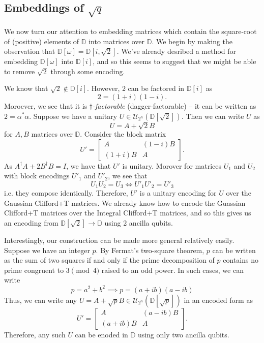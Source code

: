 \documentclass{article}
\theoremstyle{definition}
\theoremstyle{theorem}
\theoremstyle{remark}
\begin{document}
   	\subsection{Embeddings of $\sqrt{q}$}
    We now turn our attention to embedding matrices which contain the square-root of (positive) elements of $\mathbb{D}$ into matrices over $\mathbb{D}$. We begin by making the observation that $\mathbb{D}[\omega] = \mathbb{D}[i,\sqrt{2}]$. We've already desribed a method for embedding $\mathbb{D}[\omega]$ into $\mathbb{D}[i]$, and so this seems to suggest that we might be able to remove $\sqrt{2}$ through some encoding.
    
    We know that $\sqrt{2}\not\in\mathbb{D}[i]$. However, 2 can be factored in $\mathbb{D}[i]$ as
    \[
    	2 = (1+i)(1-i).
    \]
    Moroever, we see that it is \emph{$\dagger$-factorable} (dagger-factorable) -- it can be written as $2 = \alpha^* \alpha$. Suppose we have a unitary $U\in\mathcal{U}_{2^n}(\mathbb{D}[\sqrt{2}])$. Then we can write $U$ as
    \[
    	U = A + \sqrt{2}B
    \]
    for $A,B$ matrices over $\mathbb{D}$. Consider the block matrix
    \[
    	U' = \begin{bmatrix}
    	A & (1-i) B\\
    	(1+i)B & A
    	\end{bmatrix}.
    \]
    As $A^\dagger A + 2 B^\dagger B = I$, we have that $U'$ is unitary. Morover for matrices $U_1$ and $U_2$ with block encodings $U'_1$ and $U'_2$, we see that
    \[
    	U_1 U_2 = U_3 \iff U'_1 U'_2 = U'_3
     \]
     i.e. they compose identically. Therefore, $U'$ is a unitary encoding for $U$ over the Gaussian Clifford+T matrices. We already know how to encode the Guassian Clifford+T matrices over the Integral Clifford+T matrices, and so this gives us an encoding from $\mathbb{D}[\sqrt{2}]\rightarrow\mathbb{D}$ using 2 ancilla qubits.
 
	Interestingly, our construction can be made more general relatively easily. Suppose we have an integer $p$. By Fermat's two-square theorem, $p$ can be wrtten as the sum of two squares if and only if the prime decomposition of $p$ contains no prime congruent to $3\pmod 4$ raised to an odd power. In such cases, we can write
	\[
		p = a^2 + b^2\implies p = (a+ib)(a-ib)
	\]
	Thus, we can write any $U = A + \sqrt{p} B\in\mathcal{U}_{2^n}(\mathbb{D}[\sqrt{p}])$ in an encoded form as
	\[
		U' = \begin{bmatrix}
		A & (a-ib) B\\
		(a+ib) B & A
		\end{bmatrix}.
	\]
	Therefore, any such $U$ can be enoded in $\mathbb{D}$ using only two ancilla qubits.
	
\end{document}

